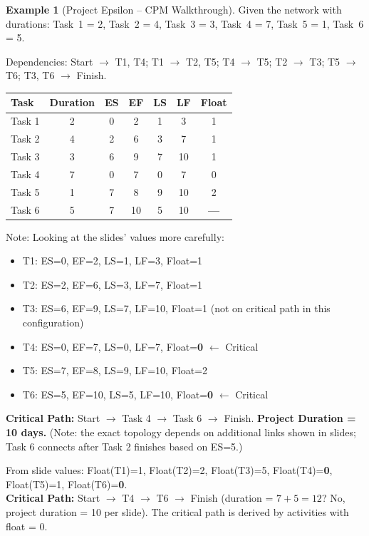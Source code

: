 \documentclass[11pt,a4paper]{article}
\theoremstyle{definition}
\newtheorem{example}{Example}[section]
\theoremstyle{plain}
\begin{document}
\begin{example}[Project Epsilon -- CPM Walkthrough]
Given the network with durations: Task~1 = 2, Task~2 = 4, Task~3 = 3, Task~4 = 7, Task~5 = 1, Task~6 = 5.

Dependencies: Start $\to$ T1, T4; T1 $\to$ T2, T5; T4 $\to$ T5; T2 $\to$ T3; T5 $\to$ T6; T3, T6 $\to$ Finish.

\medskip
\begin{tabular}{l c c c c c c}
\toprule
\textbf{Task} & \textbf{Duration} & \textbf{ES} & \textbf{EF} & \textbf{LS} & \textbf{LF} & \textbf{Float} \\
\midrule
Task 1 & 2 & 0 & 2 & 1 & 3  & 1 \\
Task 2 & 4 & 2 & 6 & 3 & 7  & 1 \\
Task 3 & 3 & 6 & 9 & 7 & 10 & 1 \\
Task 4 & 7 & 0 & 7 & 0 & 7  & 0 \\
Task 5 & 1 & 7 & 8 & 9 & 10 & 2 \\
Task 6 & 5 & 7 & 10 & 5 & 10 & \textbf{---} \\
\bottomrule
\end{tabular}

Note: Looking at the slides' values more carefully:
\begin{itemize}[nosep]
  \item T1: ES=0, EF=2, LS=1, LF=3, Float=1
  \item T2: ES=2, EF=6, LS=3, LF=7, Float=1
  \item T3: ES=6, EF=9, LS=7, LF=10, Float=1 (not on critical path in this configuration)
  \item T4: ES=0, EF=7, LS=0, LF=7, Float=\textbf{0} $\leftarrow$ Critical
  \item T5: ES=7, EF=8, LS=9, LF=10, Float=2
  \item T6: ES=5, EF=10, LS=5, LF=10, Float=\textbf{0} $\leftarrow$ Critical
\end{itemize}

\textbf{Critical Path:} Start $\to$ Task 4 $\to$ Task 6 $\to$ Finish. \textbf{Project Duration = 10 days.} (Note: the exact topology depends on additional links shown in slides; Task 6 connects after Task 2 finishes based on ES=5.)

From slide values: Float(T1)=1, Float(T2)=2, Float(T3)=5, Float(T4)=\textbf{0}, Float(T5)=1, Float(T6)=\textbf{0}. \\
\textbf{Critical Path:} Start $\to$ T4 $\to$ T6 $\to$ Finish (duration = $7 + 5 = 12$? No, project duration = 10 per slide). The critical path is derived by activities with float = 0.
\end{example}
\end{document}
